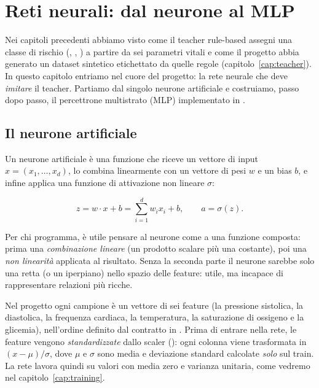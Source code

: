 
\chapter{Reti neurali: dal neurone al MLP}\label{cap:reti}

Nei capitoli precedenti abbiamo visto come il teacher rule-based assegni una
classe di rischio (, , ) a partire
da sei parametri vitali e come il progetto \progetto{} abbia generato un
dataset sintetico etichettato da quelle regole (capitolo~\ref{cap:teacher}).
In questo capitolo entriamo nel cuore del progetto: la rete neurale che deve
\textit{imitare} il teacher. Partiamo dal singolo neurone artificiale e
costruiamo, passo dopo passo, il percettrone multistrato (MLP) implementato
in  \cite{knowledge_nn2026}.

\section{Il neurone artificiale}\label{sec:neurone-artificiale}

Un neurone artificiale è una funzione che riceve un vettore di input
$x = (x_1, \dots, x_d)$, lo combina linearmente con un vettore di pesi $w$ e
un bias $b$, e infine applica una funzione di attivazione non lineare
$\sigma$:

\begin{equation}
z = w \cdot x + b = \sum_{i=1}^{d} w_i x_i + b, \qquad
a = \sigma(z).
\end{equation}

Per chi programma, è utile pensare al neurone come a una funzione composta:
prima una \emph{combinazione lineare} (un prodotto scalare più una costante),
poi una \emph{non linearità} applicata al risultato. Senza la seconda parte
il neurone sarebbe solo una retta (o un iperpiano) nello spazio delle
feature: utile, ma incapace di rappresentare relazioni più ricche.

Nel progetto \progetto{} ogni campione è un vettore di sei feature (la
pressione sistolica, la diastolica, la frequenza cardiaca, la temperatura,
la saturazione di ossigeno e la glicemia), nell'ordine definito dal contratto
in . Prima di
entrare nella rete, le feature vengono \emph{standardizzate} dallo scaler
(): ogni colonna viene
trasformata in $(x - \mu)/\sigma$, dove $\mu$ e $\sigma$ sono media e
deviazione standard calcolate \emph{solo} sul train. La rete lavora quindi
su valori con media zero e varianza unitaria, come vedremo nel
capitolo~\ref{cap:training}.

